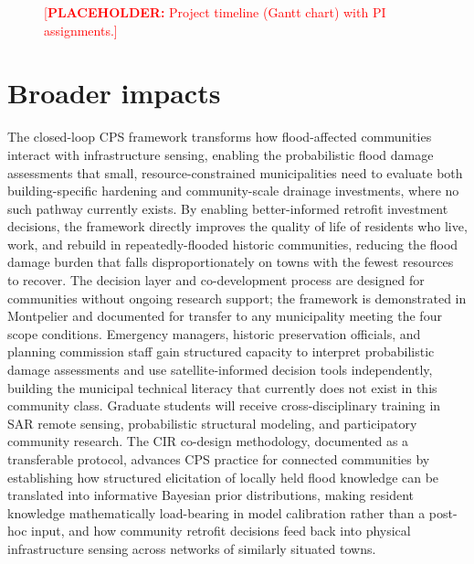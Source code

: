 \documentclass[11pt]{article}
\newcommand{\placeholder}[1]{\textcolor{red}{[\textbf{PLACEHOLDER:} #1]}}
\begin{document}
\begin{figure}
\vspace{-0.3cm}
\captionsetup{justification=centering,singlelinecheck=false,font=small}
\vspace{-0.9cm}
\caption{\placeholder{Project timeline (Gantt chart) with PI assignments.}}
\label{fig:timeline}
\vspace{-0.4cm}
\end{figure}


\section{Broader impacts}

The closed-loop CPS framework transforms how flood-affected communities interact with infrastructure sensing, enabling the probabilistic flood damage assessments that small, resource-constrained municipalities need to evaluate both building-specific hardening and community-scale drainage investments, where no such pathway currently exists.
By enabling better-informed retrofit investment decisions, the framework directly improves the quality of life of residents who live, work, and rebuild in repeatedly-flooded historic communities, reducing the flood damage burden that falls disproportionately on towns with the fewest resources to recover.
The decision layer and co-development process are designed for communities without ongoing research support; the framework is demonstrated in Montpelier and documented for transfer to any municipality meeting the four scope conditions.
Emergency managers, historic preservation officials, and planning commission staff gain structured capacity to interpret probabilistic damage assessments and use satellite-informed decision tools independently, building the municipal technical literacy that currently does not exist in this community class.
Graduate students will receive cross-disciplinary training in SAR remote sensing, probabilistic structural modeling, and participatory community research.
The CIR co-design methodology, documented as a transferable protocol, advances CPS practice for connected communities by establishing how structured elicitation of locally held flood knowledge can be translated into informative Bayesian prior distributions, making resident knowledge mathematically load-bearing in model calibration rather than a post-hoc input, and how community retrofit decisions feed back into physical infrastructure sensing across networks of similarly situated towns.
\end{document}
